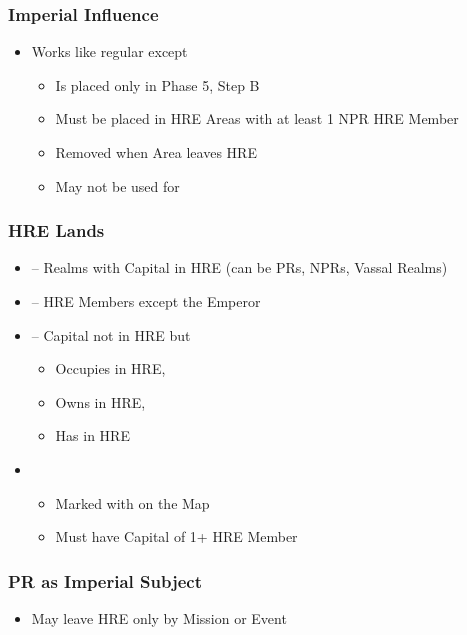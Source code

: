 \documentclass[10pt]{article}
\begin{document}
\subsubsection*{Imperial Influence }
\begin{itemize}
	\item Works like regular \influence except
	\begin{itemize}
		\item Is placed only in Phase 5, Step B
		\item Must be placed in HRE Areas with at least 1 NPR HRE Member
		\item Removed when Area leaves HRE
		\item May not be used for 
	\end{itemize}
\end{itemize}

\subsubsection*{HRE Lands }
\begin{itemize}
	\item {} -- Realms with Capital in HRE (can be PRs, NPRs, Vassal Realms)
	\item {} -- HRE Members except the Emperor
	\item {} -- Capital not in HRE but
	\begin{itemize}
		\item Occupies \town in HRE, 
		\item Owns \town in HRE, 
		\item Has \vassal in HRE
	\end{itemize}
	\item {}
	\begin{itemize}
		\item Marked with \authority on the Map
		\item Must have Capital of 1+ HRE Member
	\end{itemize}
\end{itemize}

\subsubsection*{PR as Imperial Subject }
\begin{itemize}
	\item May leave HRE only by Mission or Event
\end{itemize}
\end{document}
